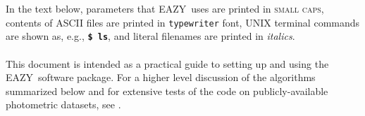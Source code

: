\documentclass[11pt]{article}
\newcommand{\photoz}{\textrm{phot-}\textit{z}}
\newcommand{\eazy}{\textsc{EAZY}}
\begin{document}
In the text below, parameters that \eazy\ uses are printed in \textsc{small
caps}, contents of ASCII files are printed in \texttt{typewriter} font, UNIX
terminal commands are shown as, e.g., \textbf{\texttt{\$ ls}},  and literal
filenames are printed in \textit{italics}.  
\ \\
\ \\
This document is intended as a practical guide to setting up and using the \eazy\ software package.  For a higher level discussion of the algorithms summarized below and for extensive tests of the code on publicly-available photometric datasets, see \cite{eazy_paper}.

%
%
%
%
%
\end{document}
